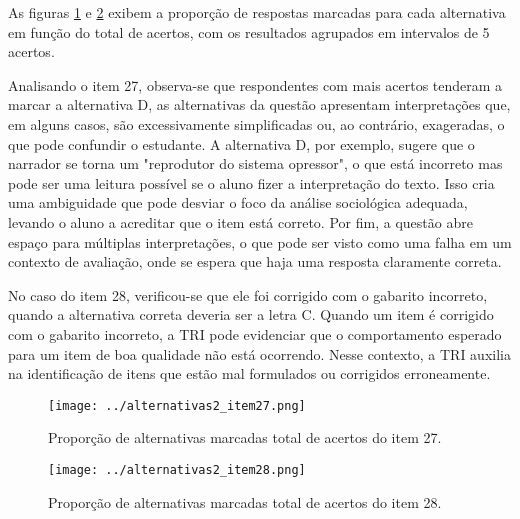As figuras \ref{fig:item_27} e \ref{fig:item_28} exibem a proporção de respostas marcadas para cada alternativa em função do total de acertos, com os resultados agrupados em intervalos de 5 acertos.

Analisando o item 27, observa-se que respondentes com mais acertos tenderam a marcar a alternativa D, as alternativas da questão apresentam interpretações que, em alguns casos, são excessivamente simplificadas ou, ao contrário, exageradas, o que pode confundir o estudante. A alternativa D, por exemplo, sugere que o narrador se torna um "reprodutor do sistema opressor", o que está incorreto mas pode ser uma leitura possível se o aluno fizer a interpretação do texto. Isso cria uma ambiguidade que pode desviar o foco da análise sociológica adequada, levando o aluno a acreditar que o item está correto. Por fim, a questão abre espaço para múltiplas interpretações, o que pode ser visto como uma falha em um contexto de avaliação, onde se espera que haja uma resposta claramente correta.
	
No caso do item 28, verificou-se que ele foi corrigido com o gabarito incorreto, quando a alternativa correta deveria ser a letra C. Quando um item é corrigido com o gabarito incorreto, a TRI pode evidenciar que o comportamento esperado para um item de boa qualidade não está ocorrendo. Nesse contexto, a TRI auxilia na identificação de itens que estão mal formulados ou corrigidos erroneamente.

\begin{figure}[H]
	\centering
	\caption{Proporção de alternativas marcadas total de acertos do item 27.}
	\texttt{[image: ../alternativas2\_item27.png]}
	\parbox{\textwidth}{
		\centering %
	}
	\label{fig:item_27}
\end{figure}


\begin{figure}[H]
	\centering
	\caption{Proporção de alternativas marcadas total de acertos do item 28.}
	\texttt{[image: ../alternativas2\_item28.png]}
	\parbox{\textwidth}{
	\centering %
}	
	\label{fig:item_28}
\end{figure}




